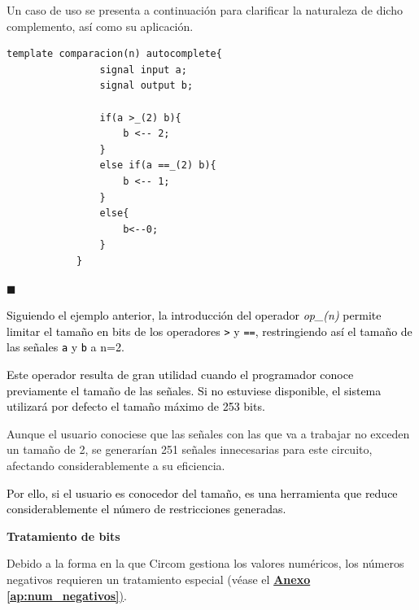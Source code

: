 \documentclass[a4paper,12pt]{report}
\begin{document}
	\vspace{0.2cm}    
	\noindent Un caso de uso se presenta a continuación para clarificar la naturaleza de dicho complemento, así como su aplicación.
	
	\begin{mi_ejemplo}[H]
		\begin{lstlisting}[language=Circom]
			template comparacion(n) autocomplete{
				signal input a;
				signal output b;
				
				if(a >_(2) b){
					b <-- 2;
				}
				else if(a ==_(2) b){
					b <-- 1;
				}
				else{
					b<--0;
				}
			}
		\end{lstlisting}
		
		\caption{Caso de uso del complemento opcional de tamaño}
		\label{ex:uso-complemento-opc}
		
		\hspace*{\fill} $\blacksquare$
	\end{mi_ejemplo}
	
	
	\vspace{0.2cm}    
	\noindent \textcolor{black}{Siguiendo el ejemplo anterior, la introducción del operador \textit{op\_(n)} permite limitar el tamaño en bits de los operadores \texttt{>} y \texttt{==}, restringiendo así el tamaño de las señales \texttt{a} y \texttt{b} a n=2.}
	
	\vspace{0.2cm}    
	\noindent \textcolor{black}{Este operador resulta de gran utilidad cuando el programador conoce previamente el tamaño de las señales. Si no estuviese disponible, el sistema utilizará por defecto el tamaño máximo de 253 bits.}
	
	\vspace{0.2cm}    
	\noindent Aunque el usuario conociese que las señales con las que va a trabajar no exceden un tamaño de 2, se generarían 251 señales innecesarias para este circuito, afectando considerablemente a su eficiencia.
	
	\vspace{0.2cm}    
	\noindent \textcolor{black}{Por ello, si el usuario es conocedor del tamaño, es una herramienta que reduce considerablemente el número de restricciones generadas.}
	
	
	\noindent \textbf{Tratamiento de bits}
	\vspace{0.2cm}
	
	\label{sssec:tra:num_negativos}
	
	\noindent Debido a la forma en la que Circom gestiona los valores numéricos, los números negativos requieren un tratamiento especial (véase el \hyperref[ap:num_negativos]{\textbf{Anexo \ref{ap:num_negativos}})}.
	
\end{document}
